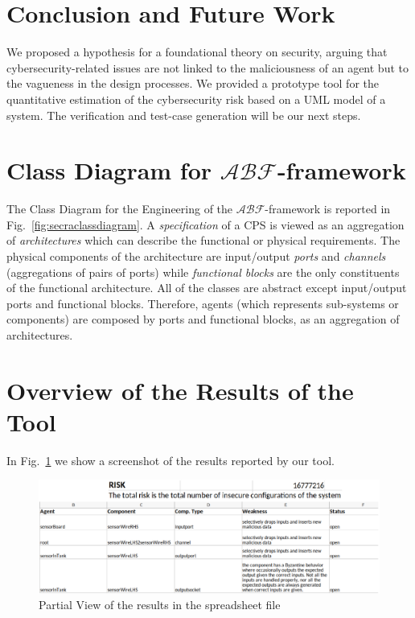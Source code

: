 \documentclass[runningheads]{llncs}
\newcommand{\assertionRegion}{\mathcal{A}}
\newcommand{\beliefRegion}{\mathcal{B}}
\newcommand{\factRegion}{\mathcal{F}}
\newcommand{\abftheory}{\assertionRegion\beliefRegion\factRegion}
\begin{document}
\section{Conclusion and Future Work}
We proposed a hypothesis for a foundational theory on security, arguing that
cybersecurity-related issues are not linked to the maliciousness of an agent
but to the vagueness in the design processes.  We provided a prototype
tool for the quantitative estimation of the cybersecurity risk based on a UML
model of a system.
The verification and test-case generation will be our next steps.

\printbibliography

\appendix
\section{Class Diagram for $\abftheory$-framework}
The Class Diagram for the Engineering of the $\abftheory$-framework is reported in
Fig.~\ref{fig:secraclassdiagram}. A \emph{specification} of a CPS is viewed
as an aggregation of \emph{architectures} which can describe the functional or
physical requirements. The physical components of the architecture are
input/output \emph{ports} and \emph{channels} (aggregations of pairs of ports)
while \emph{functional blocks} are the only constituents of the functional
architecture. All of the classes are abstract except input/output ports and
functional blocks. Therefore, agents (which represents sub-systems or
components) are composed by ports and functional blocks, as an aggregation of 
architectures.

\section{Overview of the Results of the Tool}\label{app:results}
In Fig.~\ref{fig:results} we show a screenshot of the 
results reported by our tool.
\begin{figure}[h]
	\centering
	\includegraphics[width=\textwidth]{results.pdf}
	\caption{Partial View of the results in the spreadsheet file}
	\label{fig:results}
\end{figure}
\end{document}
